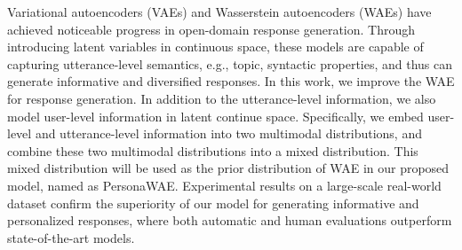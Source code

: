 Variational autoencoders (VAEs) and Wasserstein autoencoders (WAEs) have achieved noticeable progress in open-domain response generation.
Through introducing latent variables in continuous space, these models are capable of capturing utterance-level semantics, e.g., topic, syntactic properties, and thus can generate informative and diversified responses. In this work, we improve the WAE for response generation. In addition to the utterance-level information, we also model user-level information in latent continue space. Specifically, we embed user-level and utterance-level information into two multimodal distributions, and combine these two multimodal distributions into a mixed distribution.
This mixed distribution will be used as the prior distribution of WAE in our proposed model, named as PersonaWAE.
Experimental results on a large-scale real-world dataset confirm the superiority of our model for generating informative and personalized responses, where both automatic and human evaluations outperform state-of-the-art models.
